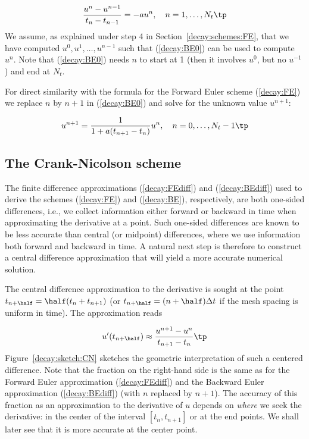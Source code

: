\documentclass[graybox,sectrefs,envcountresetchap,open=right,final]{svmonodo}
\begin{document}
\begin{equation}
\frac{u^{n}-u^{n-1}}{t_{n}-t_{n-1}} = -a u^n,\quad n=1,\ldots,N_t\tp
\label{decay:BE0}
\end{equation}
We assume, as explained under step 4 in Section~\ref{decay:schemes:FE},
that we have computed $u^0, u^1, \ldots, u^{n-1}$ such that
(\ref{decay:BE0}) can be used to compute $u^n$. Note that
(\ref{decay:BE0}) needs $n$ to start at 1 (then it involves $u^0$, but
no $u^{-1}$) and end at $N_t$.

For direct similarity with the formula for the
Forward Euler scheme (\ref{decay:FE})
we replace $n$ by $n+1$ in (\ref{decay:BE0}) and solve for the
unknown value $u^{n+1}$:

\begin{equation}
u^{n+1} = \frac{1}{1+ a(t_{n+1}-t_n)} u^n,\quad n=0,\ldots,N_t-1\tp
\label{decay:BE}
\end{equation}

\subsection{The Crank-Nicolson scheme}
\label{decay:schemes:CN}

 


The finite difference approximations
(\ref{decay:FEdiff}) and (\ref{decay:BEdiff}) used to derive the schemes
(\ref{decay:FE}) and (\ref{decay:BE}), respectively,
are both one-sided differences, i.e.,
we collect information either forward or backward in time when approximating
the derivative at a point. Such one-sided differences are
known to be less accurate than central (or midpoint)
differences, where we use information both forward and backward in
time. A natural next step is therefore to construct
a central difference approximation that will yield a more accurate
numerical solution.

The central difference approximation to the derivative is sought at the
point $t_{n+\half}=\half (t_n + t_{n+1})$ (or
$t_{n+\half}=(n+\half)\Delta t$ if the mesh spacing is uniform in time).
The approximation reads

\begin{equation}
u^{\prime}(t_{n+\half}) \approx \frac{u^{n+1}-u^n}{t_{n+1}-t_n}\tp
\label{decay:CNdiff}
\end{equation}
Figure~\ref{decay:sketch:CN} sketches the geometric interpretation of
such a centered difference.
Note that the fraction on the right-hand side is the same as for the
Forward Euler approximation (\ref{decay:FEdiff}) and
the Backward Euler approximation (\ref{decay:BEdiff}) (with
$n$ replaced by $n+1$). The accuracy of this fraction as an approximation
to the derivative of $u$ depends on \emph{where} we seek the derivative:
in the center of the interval $[t_{n},t_{n+1}]$ or at the end points.
We shall later see that it is more accurate at the center point.
\end{document}
